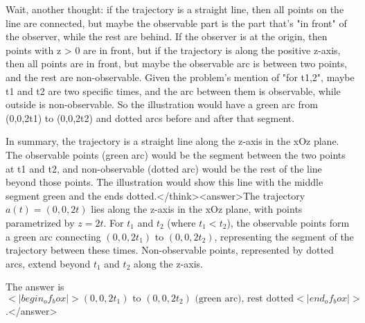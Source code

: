 Wait, another thought: if the trajectory is a straight line, then all points on the line are connected, but maybe the observable part is the part that's "in front" of the observer, while the rest are behind. If the observer is at the origin, then points with z > 0 are in front, but if the trajectory is along the positive z-axis, then all points are in front, but maybe the observable arc is between two points, and the rest are non-observable. Given the problem's mention of "for t1,2", maybe t1 and t2 are two specific times, and the arc between them is observable, while outside is non-observable. So the illustration would have a green arc from (0,0,2t1) to (0,0,2t2) and dotted arcs before and after that segment.

In summary, the trajectory is a straight line along the z-axis in the xOz plane. The observable points (green arc) would be the segment between the two points at t1 and t2, and non-observable (dotted arc) would be the rest of the line beyond those points. The illustration would show this line with the middle segment green and the ends dotted.</think><answer>The trajectory \( a(t) = (0, 0, 2t) \) lies along the z-axis in the xOz plane, with points parametrized by \( z = 2t \). For \( t_1 \) and \( t_2 \) (where \( t_1 < t_2 \)), the observable points form a green arc connecting \( (0, 0, 2t_1) \) to \( (0, 0, 2t_2) \), representing the segment of the trajectory between these times. Non-observable points, represented by dotted arcs, extend beyond \( t_1 \) and \( t_2 \) along the z-axis.  

The answer is \(<|begin_of_box|>(0, 0, 2t_1) \text{ to } (0, 0, 2t_2) \text{ (green arc), rest dotted}<|end_of_box|>\).</answer>